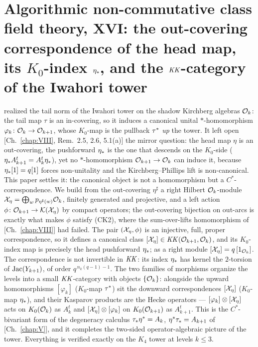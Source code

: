 \renewcommand{\XX}{\mathfrak{X}}
\chapter[\texorpdfstring{XVI. The out-covering correspondence of the head map, its $K_0$-index $\et$, and the
$\KK$-category of the Iwahori tower}{XVI. The out-covering correspondence of the head map, its K0-index , and the KK-category of the Iwahori tower}]{\texorpdfstring{Algorithmic non-commutative class field theory, XVI: the out-covering correspondence of the head map, its $K_0$-index $\et$, and the
$\KK$-category of the Iwahori tower}{Algorithmic non-commutative class field theory, XVI: the out-covering correspondence of the head map, its K0-index , and the KK-category of the Iwahori tower}}\label{chap:XVI}
\begin{chapterabstract}
 realized the tail norm of the Iwahori tower on the shadow Kirchberg algebras
$\mathcal{O}_k$: the tail map $\tau$ is an in-covering, so it induces a canonical unital
$*$-homomorphism $\varphi_k\colon\mathcal{O}_k\to\mathcal{O}_{k+1}$, whose $K_0$-map is the pullback
$\tau^*$ \emph{up} the tower. It left open [Ch.~\ref{chap:VIII}, Rem.~2.5, 2.6, 5.1(a)] the mirror
question: the head map $\eta$ is an out-covering, the pushforward $\et$ is the one that
descends on the $K_0$-side ($\eta_* A_{k+1}^{t}=A_k^{t}\eta_*$), yet no $*$-homomorphism
$\mathcal{O}_{k+1}\to\mathcal{O}_k$ can induce it, because $\eta_*[1]=q[1]$ forces non-unitality and the
Kirchberg--Phillips lift is non-canonical. This paper settles it: the canonical object
is not a homomorphism but a $C^*$-correspondence. We build from the out-covering
$\eta^{\sharp}$ a right Hilbert $\mathcal{O}_k$-module
$\mathcal{X}_\eta=\bigoplus_{w}p_{\eta^{\sharp}(w)}\mathcal{O}_k$, finitely generated and projective, and
a left action $\phi\colon\mathcal{O}_{k+1}\to\mathcal{K}(\mathcal{X}_\eta)$ by compact operators; the out-covering
bijection on out-arcs is exactly what makes $\phi$ satisfy (CK2), where the sum-over-lifts
homomorphism of [Ch.~\ref{chap:VIII}] had failed. The pair $(\mathcal{X}_\eta,\phi)$ is an injective, full,
proper correspondence, so it defines a canonical class
$[\mathcal{X}_\eta]\in\mathit{KK}(\mathcal{O}_{k+1},\mathcal{O}_k)$, and its $K_0$-index map is precisely the head
pushforward $\et$; as a right module $[\mathcal{X}_\eta]=q\,[1_{\mathcal{O}_k}]$. The correspondence is
not invertible in $\KK$: its index $\et$ has kernel the $2$-torsion of $\operatorname{Jac}(Y_{k+1})$,
of order $q^{\,n_k(q-1)-1}$. The two families of morphisms organize the levels into a
small $\KK$-category with objects $\{\mathcal{O}_k\}$: alongside the upward homomorphisms
$[\varphi_k]$ ($K_0$-map $\tau^*$) sit the downward correspondences $[\mathcal{X}_\eta]$ ($K_0$-map
$\et$), and their Kasparov products are the Hecke operators ---
$[\varphi_k]\otimes[\mathcal{X}_\eta]$ acts on $K_0(\mathcal{O}_k)$ as $A_k^{t}$ and
$[\mathcal{X}_\eta]\otimes[\varphi_k]$ on $K_0(\mathcal{O}_{k+1})$ as $A_{k+1}^{t}$. This is the
$C^*$-bivariant form of the degeneracy calculus $\tau_*\eta^*=A_k$, $\eta^*\tau_*=A_{k+1}$ of [Ch.~\ref{chap:V}],
and it completes the two-sided operator-algebraic picture of the tower. Everything is
verified exactly on the $K_4$ tower at levels $k\le3$.
\end{chapterabstract}


